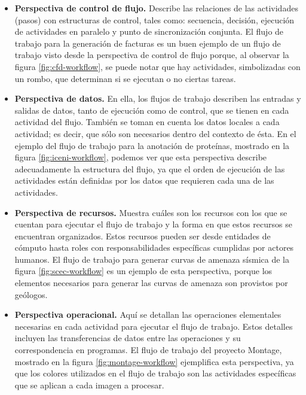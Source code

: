 \begin{itemize}
\item{\textbf{Perspectiva de control de flujo.} Describe las relaciones de las actividades (pasos) con estructuras de control, tales como: secuencia, decisión, ejecución de actividades en paralelo y punto de sincronización conjunta. El flujo de trabajo para la generación de facturas es un buen ejemplo de un flujo de trabajo visto desde la perspectiva de control de flujo porque, al observar la figura \ref{fig:cfd-workflow}, se puede notar que hay actividades, simbolizadas con un rombo, que determinan si se ejecutan o no ciertas tareas.
}

\item{\textbf{Perspectiva de datos.} En ella, los flujos de trabajo describen las entradas y salidas de datos, tanto de ejecución como de control, que se tienen en cada actividad del flujo. También se toman en cuenta los datos locales a cada actividad; es decir, que sólo son necesarios dentro del contexto de ésta. En el ejemplo del flujo de trabajo para la anotación de proteínas, mostrado en la figura \ref{fig:iceni-workflow}, podemos ver que esta perspectiva describe adecuadamente la estructura del flujo, ya que el orden de ejecución de las actividades están definidas por los datos que requieren cada una de las actividades.}

\item{\textbf{Perspectiva de recursos.} Muestra cuáles son los recursos con los que se cuentan para ejecutar el flujo de trabajo y la forma en que estos recursos se encuentran organizados. Estos recursos pueden ser desde entidades de cómputo hasta roles con responsabilidades específicas cumplidas por actores humanos. El flujo de trabajo para generar curvas de amenaza sísmica de la figura \ref{fig:scec-workflow} es un ejemplo de esta perspectiva, porque los elementos necesarios para generar las curvas de amenaza son provistos por geólogos.}

\item{\textbf{Perspectiva operacional.} Aquí se detallan las operaciones elementales necesarias en cada actividad para ejecutar el flujo de trabajo. Estos detalles incluyen las transferencias de datos entre las operaciones y su correspondencia en programas. El flujo de trabajo del proyecto Montage, mostrado en la figura \ref{fig:montage-workflow} ejemplifica esta perspectiva, ya que los colores utilizados en el flujo de trabajo son las actividades específicas que se aplican a cada imagen a procesar.}
\end{itemize}

